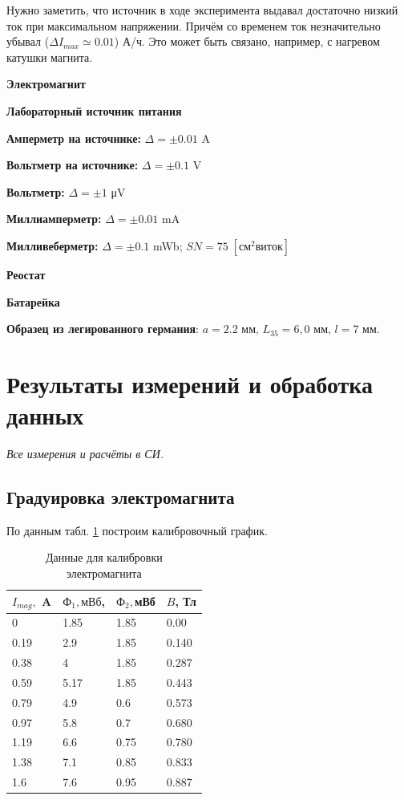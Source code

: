 \documentclass[a4paper]{article}
\newcommand{\Equip}[3]{
	
	{\bf #1:} $\Delta = \pm #2$ \si{#3}}
\newcommand{\equip}[1]{
	
	{\bf #1}}
\begin{document}
Нужно заметить, что источник в ходе эксперимента выдавал достаточно низкий ток при максимальном напряжении. Причём со временем ток незначительно убывал ($\Delta I_{max} \simeq 0.01 $) А/ч. Это может быть связано, например, с нагревом катушки магнита.

\equip{Электромагнит}
\equip{Лабораторный источник питания}
\Equip{Амперметр на источнике}{0.01}{\ampere}
\Equip{Вольтметр на источнике}{0.1}{\volt}
\Equip{Вольтметр}{1}{\micro \volt}
\Equip{Миллиамперметр}{0.01}{\milli \ampere}
\Equip{Милливеберметр}{0.1}{\milli \weber}; $ S N = 75\; \left[ см^2 виток\right]  $

\equip{Реостат}
\equip{Батарейка}
\equip{Образец из легированного германия}: $ a = 2.2  $ мм, $ L_{3 5} = 6,0 $ мм, $ l = 7 $ мм.


\section{Результаты измерений и обработка данных}

\emph{Все измерения и расчёты в СИ.}

\subsection{Градуировка электромагнита}

По данным табл. \ref{tab:calibre} построим калибровочный график. 
\begin{table}
	\centering
\begin{tabular}{|l|l|l|l|}
	\hline
	$I_{mag},$ A & $Ф_1, мВб$, & $Ф_2, $мВб & $B$, Тл \\ \hline
	0            & 1.85        & 1.85       & 0.00    \\ \hline
	0.19         & 2.9         & 1.85       & 0.140   \\ \hline
	0.38         & 4           & 1.85       & 0.287   \\ \hline
	0.59         & 5.17        & 1.85       & 0.443   \\ \hline
	0.79         & 4.9         & 0.6        & 0.573   \\ \hline
	0.97         & 5.8         & 0.7        & 0.680   \\ \hline
	1.19         & 6.6         & 0.75       & 0.780   \\ \hline
	1.38         & 7.1         & 0.85       & 0.833   \\ \hline
	1.6          & 7.6         & 0.95       & 0.887   \\ \hline
\end{tabular}
	\caption{Данные для калибровки электромагнита}
	\label{tab:calibre}
\end{table}
\end{document}
